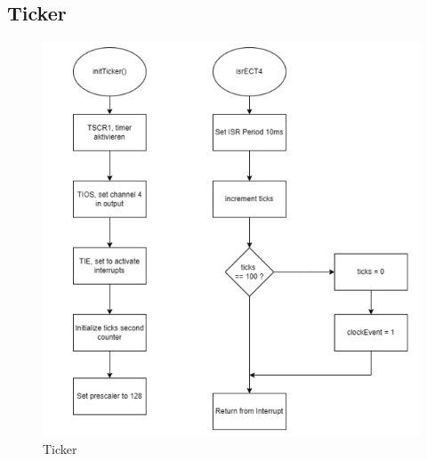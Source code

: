 \documentclass[a4paper,12pt]{article}
\begin{document}
\subsection{Ticker}
\begin{figure}[H]
    \centering
    \includegraphics[width=1\textwidth]{diagrams/ticker.png}
    \caption{Ticker}
    \label{fig:MainTicker}
\end{figure}
\end{document}
